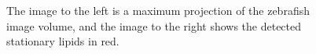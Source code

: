 \begin{enumerate}
\begin{figure}[!htbp]
\centering
{}
\caption{\label{fig:hamid}
The image to the left is a maximum projection of the zebrafish image volume, and the image to the right shows the detected stationary lipids in red.}
\end{figure}



\end{enumerate}
